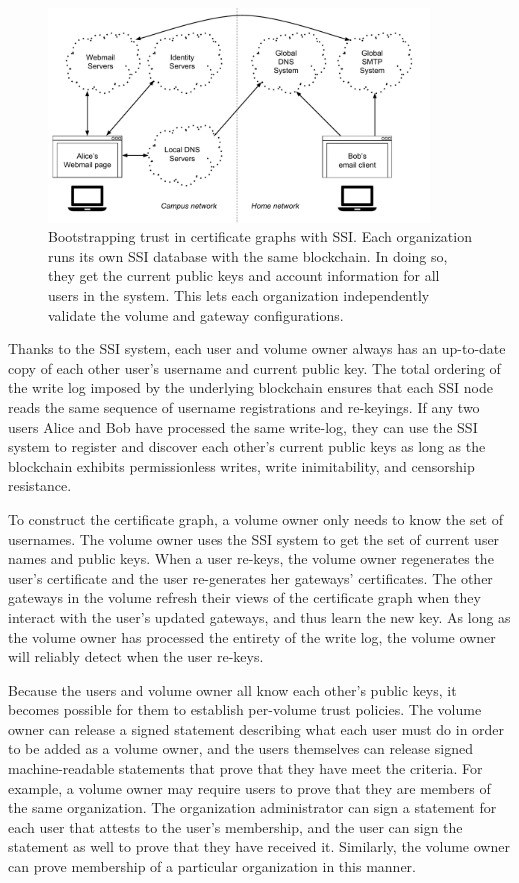 \begin{figure}[h!]
   \centering
   \includegraphics[width=0.9\textwidth,page=15]{figures/dissertation-figures}
   \caption{Bootstrapping trust in certificate graphs with SSI.  Each
   organization runs its own SSI database with the same blockchain.  In doing
   so, they get the current public keys and account information for all users in
   the system.  This lets each organization independently validate the volume
   and gateway configurations.}
   \label{fig:chap2-ssi-system-with-volumes}
\end{figure}

Thanks to the SSI system, each user and volume owner always has an up-to-date
copy of each other user's username and current public key.  The total ordering
of the write log imposed by the underlying blockchain
ensures that each SSI node reads the same sequence of
username registrations and re-keyings.  If any two users Alice and Bob have
processed the same write-log, they can use the SSI system to register and
discover each other's current public keys as long as the blockchain exhibits
permissionless writes, write inimitability, and censorship resistance. 

To construct the certificate graph, a volume owner only needs to know the set of
usernames.  The volume owner uses the SSI system to get the set of current
user names and public keys.  When a user re-keys, the volume owner regenerates the user's
certificate and the user re-generates her gateways' certificates.  The other
gateways in the volume refresh their views of the certificate graph when they
interact with the user's updated gateways, and thus learn the new key.
As long as the volume owner has
processed the entirety of the write log, the volume owner will reliably detect
when the user re-keys.

Because the users and volume owner all know each other's public keys, it becomes
possible for them to establish per-volume trust policies.  The volume owner
can release a signed statement describing what each user must do in order to be
added as a volume owner, and the users themselves can release signed
machine-readable statements that prove that they have meet the criteria.  For example, a volume owner may
require users to prove that they are members of the same organization.  The
organization administrator can sign a statement for each user that attests to the user's
membership, and the user can sign the statement as well to prove that they have
received it.  Similarly, the volume owner can prove membership of a particular
organization in this manner.

